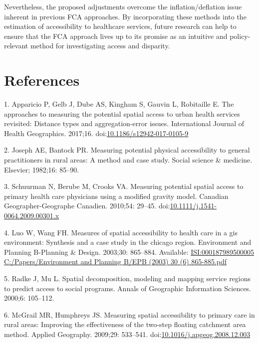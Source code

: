 \documentclass[10pt,letterpaper]{article}
\begin{document}
Nevertheless, the proposed adjustments overcome the inflation/deflation
issue inherent in previous FCA approaches. By incorporating these
methods into the estimation of accessibility to healthcare services,
future research can help to ensure that the FCA approach lives up to its
promise as an intuitive and policy-relevant method for investigating
access and disparity.

\section*{References}\label{references}

\hypertarget{refs}{}
\hypertarget{ref-Apparicio2017}{}
1. Apparicio P, Gelb J, Dube AS, Kingham S, Gauvin L, Robitaille E. The
approaches to measuring the potential spatial access to urban health
services revisited: Distance types and aggregation-error issues.
International Journal of Health Geographics. 2017;16.
doi:\href{https://doi.org/10.1186/s12942-017-0105-9}{10.1186/s12942-017-0105-9}

\hypertarget{ref-Joseph1982}{}
2. Joseph AE, Bantock PR. Measuring potential physical accessibility to
general practitioners in rural areas: A method and case study. Social
science \& medicine. Elsevier; 1982;16: 85--90.

\hypertarget{ref-Schuurman2010}{}
3. Schuurman N, Berube M, Crooks VA. Measuring potential spatial access
to primary health care physicians using a modified gravity model.
Canadian Geographer-Geographe Canadien. 2010;54: 29--45.
doi:\href{https://doi.org/10.1111/j.1541-0064.2009.00301.x}{10.1111/j.1541-0064.2009.00301.x}

\hypertarget{ref-Luo2003}{}
4. Luo W, Wang FH. Measures of spatial accessibility to health care in a
gis environment: Synthesis and a case study in the chicago region.
Environment and Planning B-Planning \& Design. 2003;30: 865--884.
Available:
\href{ISI:000187989500005\%0AC:/Papers/Environment\%20and\%20Planning\%20B/EPB\%20(2003)\%2030\%20(6)\%20865-885.pdf}{ISI:000187989500005
C:/Papers/Environment and Planning B/EPB (2003) 30 (6) 865-885.pdf}

\hypertarget{ref-Radke2000}{}
5. Radke J, Mu L. Spatial decomposition, modeling and mapping service
regions to predict access to social programs. Annals of Geographic
Information Sciences. 2000;6: 105--112.

\hypertarget{ref-McGrail2009}{}
6. McGrail MR, Humphreys JS. Measuring spatial accessibility to primary
care in rural areas: Improving the effectiveness of the two-step
floating catchment area method. Applied Geography. 2009;29: 533--541.
doi:\href{https://doi.org/10.1016/j.apgeog.2008.12.003}{10.1016/j.apgeog.2008.12.003}
\end{document}
